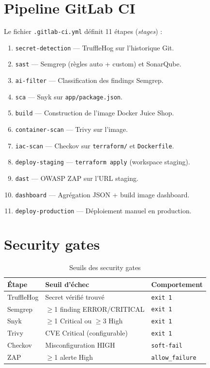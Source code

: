 \documentclass[12pt,a4paper]{report}
\begin{document}
\section{Pipeline GitLab CI}
Le fichier \texttt{.gitlab-ci.yml} définit 11 étapes (\textit{stages}) :
\begin{enumerate}
    \item \texttt{secret-detection} --- TruffleHog sur l'historique Git.
    \item \texttt{sast} --- Semgrep (règles auto + custom) et SonarQube.
    \item \texttt{ai-filter} --- Classification des findings Semgrep.
    \item \texttt{sca} --- Snyk sur \texttt{app/package.json}.
    \item \texttt{build} --- Construction de l'image Docker Juice Shop.
    \item \texttt{container-scan} --- Trivy sur l'image.
    \item \texttt{iac-scan} --- Checkov sur \texttt{terraform/} et \texttt{Dockerfile}.
    \item \texttt{deploy-staging} --- \texttt{terraform apply} (workspace staging).
    \item \texttt{dast} --- OWASP ZAP sur l'URL staging.
    \item \texttt{dashboard} --- Agrégation JSON + build image dashboard.
    \item \texttt{deploy-production} --- Déploiement manuel en production.
\end{enumerate}

\section{Security gates}
\begin{table}[H]
\centering
\small
\begin{tabular}{@{}lll@{}}
\toprule
\textbf{Étape} & \textbf{Seuil d'échec} & \textbf{Comportement} \\
\midrule
TruffleHog & Secret vérifié trouvé & \texttt{exit 1} \\
Semgrep & $\geq$1 finding ERROR/CRITICAL & \texttt{exit 1} \\
Snyk & $\geq$1 Critical ou $\geq$3 High & \texttt{exit 1} \\
Trivy & CVE Critical (configurable) & \texttt{exit 1} \\
Checkov & Misconfiguration HIGH & \texttt{soft-fail} \\
ZAP & $\geq$1 alerte High & \texttt{allow\_failure} \\
\bottomrule
\end{tabular}
\caption{Seuils des security gates}
\label{tab:gates}
\end{table}
\end{document}
